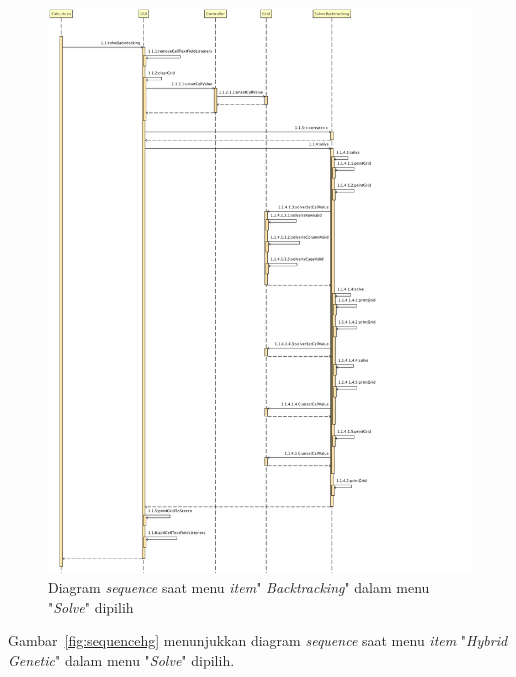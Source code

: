 \begin{figure}
\centering
\captionsetup{justification=centering}
\includegraphics[scale=0.4]{Gambar/Analisis/SequenceDiagramBacktracking.png}
\caption[Diagram \textit{sequence} saat menu \textit{item}" \textit{Backtracking}" dalam menu "\textit{Solve}" dipilih]{Diagram \textit{sequence} saat menu \textit{item}" \textit{Backtracking}" dalam menu "\textit{Solve}" dipilih}
\label{fig:sequencebt}
\end{figure}

Gambar~\ref{fig:sequencehg} menunjukkan diagram \textit{sequence} saat menu \textit{item} "\textit{Hybrid Genetic}" dalam menu "\textit{Solve}" dipilih.

